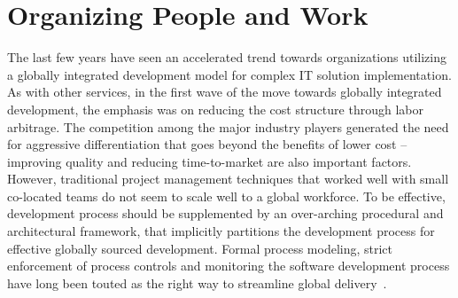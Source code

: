 \section{Organizing People and Work}


The last few years have seen an accelerated trend towards organizations utilizing a globally integrated development model for complex IT solution implementation. As with other services, in the first wave of the move towards globally integrated development, the emphasis was on reducing the cost structure through labor arbitrage.  The competition among the major industry players generated the need for aggressive differentiation that goes beyond the benefits of lower cost -- improving quality and reducing time-to-market are also important factors. However, traditional project management techniques that worked well with small co-located teams do not seem to scale well to a global workforce.  To be effective, development process should be supplemented by an over-arching procedural and architectural framework, that implicitly partitions the development process for effective globally sourced development. Formal process modeling, strict enforcement of process controls and monitoring the software development process have long been touted as the right way to streamline global delivery~\cite{glo32}. 

